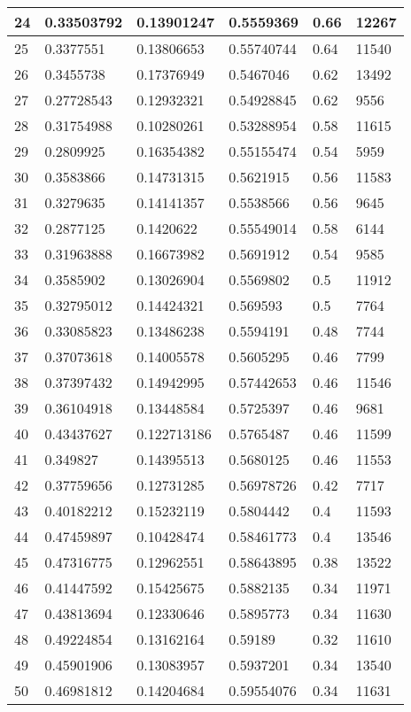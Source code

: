 \begin{longtable}{|l|l|l|l|l|l|}
24 & 0.33503792 & 0.13901247 & 0.5559369 & 0.66 & 12267 \\ \hline 
25 & 0.3377551 & 0.13806653 & 0.55740744 & 0.64 & 11540 \\ \hline 
26 & 0.3455738 & 0.17376949 & 0.5467046 & 0.62 & 13492 \\ \hline 
27 & 0.27728543 & 0.12932321 & 0.54928845 & 0.62 & 9556 \\ \hline 
28 & 0.31754988 & 0.10280261 & 0.53288954 & 0.58 & 11615 \\ \hline 
29 & 0.2809925 & 0.16354382 & 0.55155474 & 0.54 & 5959 \\ \hline 
30 & 0.3583866 & 0.14731315 & 0.5621915 & 0.56 & 11583 \\ \hline 
31 & 0.3279635 & 0.14141357 & 0.5538566 & 0.56 & 9645 \\ \hline 
32 & 0.2877125 & 0.1420622 & 0.55549014 & 0.58 & 6144 \\ \hline 
33 & 0.31963888 & 0.16673982 & 0.5691912 & 0.54 & 9585 \\ \hline 
34 & 0.3585902 & 0.13026904 & 0.5569802 & 0.5 & 11912 \\ \hline 
35 & 0.32795012 & 0.14424321 & 0.569593 & 0.5 & 7764 \\ \hline 
36 & 0.33085823 & 0.13486238 & 0.5594191 & 0.48 & 7744 \\ \hline 
37 & 0.37073618 & 0.14005578 & 0.5605295 & 0.46 & 7799 \\ \hline 
38 & 0.37397432 & 0.14942995 & 0.57442653 & 0.46 & 11546 \\ \hline 
39 & 0.36104918 & 0.13448584 & 0.5725397 & 0.46 & 9681 \\ \hline 
40 & 0.43437627 & 0.122713186 & 0.5765487 & 0.46 & 11599 \\ \hline 
41 & 0.349827 & 0.14395513 & 0.5680125 & 0.46 & 11553 \\ \hline 
42 & 0.37759656 & 0.12731285 & 0.56978726 & 0.42 & 7717 \\ \hline 
43 & 0.40182212 & 0.15232119 & 0.5804442 & 0.4 & 11593 \\ \hline 
44 & 0.47459897 & 0.10428474 & 0.58461773 & 0.4 & 13546 \\ \hline 
45 & 0.47316775 & 0.12962551 & 0.58643895 & 0.38 & 13522 \\ \hline 
46 & 0.41447592 & 0.15425675 & 0.5882135 & 0.34 & 11971 \\ \hline 
47 & 0.43813694 & 0.12330646 & 0.5895773 & 0.34 & 11630 \\ \hline 
48 & 0.49224854 & 0.13162164 & 0.59189 & 0.32 & 11610 \\ \hline 
49 & 0.45901906 & 0.13083957 & 0.5937201 & 0.34 & 13540 \\ \hline 
50 & 0.46981812 & 0.14204684 & 0.59554076 & 0.34 & 11631 \\ \hline 
\end{longtable}